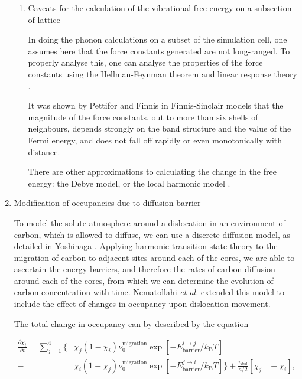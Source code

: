 \documentclass[a4paper,12pt,oneside,print,numbered,index,PageStyleIII]{PhDThesisPSnPDF}
\begin{document}
\begin{enumerate}
\begin{enumerate}
\item Caveats for the calculation of the vibrational free energy on a subsection of lattice
\label{sec:orgc0589f6}

In doing the phonon calculations on a subset of the simulation cell, one
assumes here that the force constants generated are not long-ranged. To
properly analyse this, one can analyse the properties of the force constants
using the Hellman-Feynman theorem and linear response theory
\cite{Finnis2003}.

It was shown by Pettifor and Finnis \cite{Pettifor1987} in Finnis-Sinclair
models that the magnitude of the force constants, out to more than six
shells of neighbours, depends strongly on the band structure and the value
of the Fermi energy, and does not fall off rapidly or even monotonically
with distance.

There are other approximations to calculating the change in the free energy:
the Debye model, or the local harmonic model \cite{Garbulsky1996}.
\end{enumerate}


\item Modification of occupancies due to diffusion barrier
\label{sec:org10f520c}


To model the solute atmosphere around a dislocation in an environment of
carbon, which is allowed to diffuse, we can use a discrete diffusion model,
as detailed in Yoshinaga \cite{Yoshinaga1971}. Applying harmonic
transition-state theory to the migration of carbon to adjacent sites around each of the cores,
we are able to ascertain the energy barriers, and therefore the rates of
carbon diffusion around each of the cores, from which we can determine the
evolution of carbon concentration with time. Nematollahi \emph{et al.} \cite{Nematollahi2016} extended this model
to include the effect of changes in occupancy upon dislocation movement.

The total change in occupancy can by described by
the equation

\begin{align*}
  \frac{\partial \chi_i}{\partial t} = \sum_{j=1}^4
 \Big\{ &\chi_j (1 - \chi_i) \nu_0^{\text{migration}} \exp{\left[ -
E_{\text{barrier}}^{i\rightarrow j} / k_{\text{B}} T\right]}\\ -
       &\chi_i (1 - \chi_j) \nu_0^{\text{migration}} \exp{\left[ -
E_{\text{barrier}}^{j\rightarrow i} / k_{\text{B}} T\right]}
\Big\} + \frac{\bar{v}_{\text{disl}}}{a/2} [\chi_{j+} - \chi_{i}],\label{eq:discrete_diffusion_model}
\end{align*}


\end{enumerate}
\end{document}

